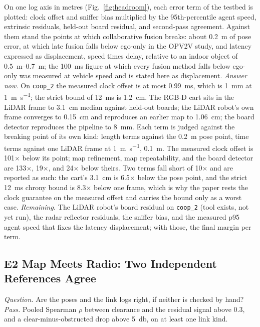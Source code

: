 \documentclass[journal]{IEEEtran}
\begin{document}
On one log axis in metres (Fig.~\ref{fig:headroom}), each error term
of the testbed is plotted: clock offset and sniffer bias multiplied by
the 95th-percentile agent speed, extrinsic residuals, held-out board
residual, and second-pass agreement. Against them stand the points at
which collaborative fusion breaks: about \SI{0.2}{\metre} of pose
error, at which late fusion falls below ego-only in the OPV2V study,
and latency expressed as displacement, speed times delay, relative to
an indoor object of \SIrange{0.5}{0.7}{\metre}; the \SI{100}{\milli\second}
figure at which every fusion method falls below ego-only was measured
at vehicle speed and is stated here as displacement. \emph{Answer now.} On \texttt{coop\_2} the measured clock offset is
at most \SI{0.99}{\milli\second}, which is \SI{1}{\milli\metre} at
\SI{1}{\metre\per\second}; the strict bound of \SI{12}{\milli\second}
is \SI{1.2}{\centi\metre}. The RGB-D cart sits in the LiDAR frame to
\SI{3.1}{\centi\metre} median against held-out boards; the LiDAR
robot's own frame converges to \SI{0.15}{\centi\metre} and
reproduces an earlier map to \SI{1.06}{\centi\metre}; the board
detector reproduces the pipeline to \SI{8}{\milli\metre}. Each
term is judged against the breaking point of its own kind: length terms
against the \SI{0.2}{\metre} pose point, time terms against one
LiDAR frame at \SI{1}{\metre\per\second}, \SI{0.1}{\metre}. The
measured clock offset is 101$\times$ below its point; map refinement,
map repeatability, and the board detector are 133$\times$, 19$\times$,
and 24$\times$ below theirs. Two terms fall short of 10$\times$ and are
reported as such: the cart's \SI{3.1}{\centi\metre} is 6.5$\times$
below the pose point, and the strict \SI{12}{\milli\second} chrony
bound is 8.3$\times$ below one frame, which is why the paper rests the
clock guarantee on the measured offset and carries the bound only as a
worst case. \emph{Remaining.} The LiDAR robot's board
residual on \texttt{coop\_2} (tool exists, not yet run), the radar
reflector residuals, the sniffer bias, and the measured p95 agent
speed that fixes the latency displacement; with those, the final
margin per term.





\subsection{E2 Map Meets Radio: Two Independent References Agree}
\emph{Question.} Are the poses and the link logs right, if neither is
checked by hand? \emph{Pass.} Pooled Spearman $\rho$ between clearance
and the residual signal above 0.3, and a clear-minus-obstructed drop
above \SI{5}{\decibel}, on at least one link kind.
\end{document}
